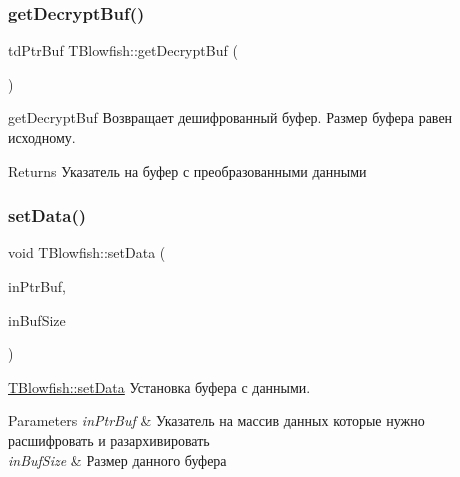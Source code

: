 \subsubsection{\texorpdfstring{get\+Decrypt\+Buf()}{getDecryptBuf()}}
{\footnotesize\ttfamily td\+Ptr\+Buf T\+Blowfish\+::get\+Decrypt\+Buf (\begin{DoxyParamCaption}{ }\end{DoxyParamCaption})}



get\+Decrypt\+Buf Возвращает дешифрованный буфер. Размер буфера равен исходному. 

\begin{DoxyReturn}{Returns}
Указатель на буфер с преобразованными данными 
\end{DoxyReturn}
\mbox{\label{classblowfish_lib_1_1_t_blowfish_aac58cd909cef267ba409859c279dc521}} 
\subsubsection{\texorpdfstring{set\+Data()}{setData()}}
{\footnotesize\ttfamily void T\+Blowfish\+::set\+Data (\begin{DoxyParamCaption}\item[{td\+Ptr\+Buf}]{in\+Ptr\+Buf,  }\item[{quint32}]{in\+Buf\+Size }\end{DoxyParamCaption})}



\hyperlink{classblowfish_lib_1_1_t_blowfish_aac58cd909cef267ba409859c279dc521}{T\+Blowfish\+::set\+Data} Установка буфера с данными. 


\begin{DoxyParams}{Parameters}
{\em in\+Ptr\+Buf} & Указатель на массив данных которые нужно расшифровать и разархивировать \\
\hline
{\em in\+Buf\+Size} & Размер данного буфера \\
\hline
\end{DoxyParams}
\mbox{\label{classblowfish_lib_1_1_t_blowfish_a17896279118b13a237ab31c1cb82da26}} 
